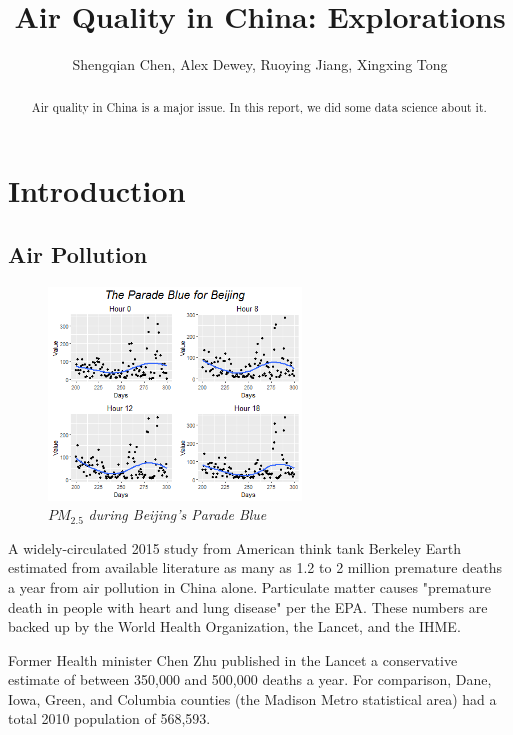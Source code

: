 \documentclass[11pt]{article} %
\title{\textbf{Air Quality in China: Explorations}}
\author{Shengqian Chen, Alex Dewey, Ruoying Jiang, Xingxing Tong}
\begin{document}
\maketitle

\begin{abstract}
Air quality in China is a major issue.\cite{Moore14} In this report, we did some data science about it.
\end{abstract}

\section{Introduction}

\subsection{Air Pollution}

\begin{figure}[!ht]
  \centering
    \includegraphics[width=0.6\textwidth]{ParadeBlueBeijing}
      \caption{\(\mathit{PM_{2.5}}\) \textit{during Beijing's Parade Blue}}
\end{figure}

A widely-circulated 2015 study from American
think tank Berkeley Earth estimated from available literature
as many as 1.2 to 2 million premature deaths a year from air pollution
in China alone. Particulate matter causes "premature death 
in people with heart and lung disease" per the EPA. 
These numbers are backed up by the World
Health Organization, the Lancet, and the IHME.

Former Health minister Chen Zhu published 
in the Lancet a conservative estimate of between
350,000 and 500,000 deaths a year. For comparison,
Dane, Iowa, Green, and Columbia counties (the 
Madison Metro statistical area) had a total
2010 population of 568,593.
\end{document}
